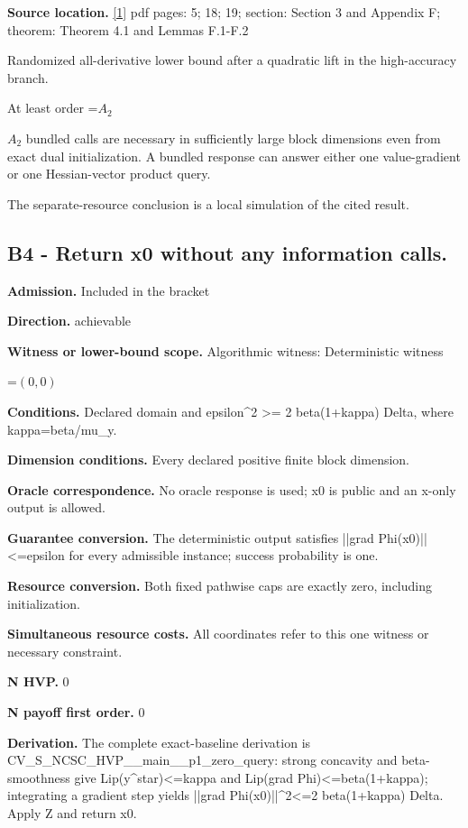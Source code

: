 \documentclass[10pt,a4paper]{article}
\newcommand{\AtlasMath}[1]{\par\begingroup\centering\setbox0=\hbox{$\displaystyle #1$}\ifdim\wd0>1.4\linewidth\typeout{ATLAS WIDE FORMULA: \the\wd0}\fi\ifdim\wd0>\linewidth\resizebox{\linewidth}{!}{\box0}\else\box0\fi\par\endgroup}
\newcommand{\AtlasInlineMath}[1]{\begingroup\setbox0=\hbox{$#1$}\ifdim\wd0>.4\linewidth\endgroup\AtlasMath{#1}\else\endgroup$#1$\fi}
\begin{document}
\textbf{Source location.} \href{https://arxiv.org/pdf/2610.16771v2}{[1]} pdf pages: 5; 18; 19; section: Section 3 and Appendix F; theorem: Theorem 4.1 and Lemmas F.1-F.2

Randomized all-derivative lower bound after a quadratic lift in the high-accuracy branch.

At least order \AtlasInlineMath{A_2} bundled calls are necessary in sufficiently large block dimensions even from exact dual initialization. A bundled response can answer either one value-gradient or one Hessian-vector product query.

The separate-resource conclusion is a local simulation of the cited result.

\subsection{B4 - Return x0 without any information calls.}
\textbf{Admission.} Included in the bracket

\textbf{Direction.} achievable

\textbf{Witness or lower-bound scope.} Algorithmic witness: Deterministic witness

\AtlasMath{(0,0)}
\textbf{Conditions.} Declared domain and epsilon\textasciicircum{}2 >= 2 beta(1+kappa) Delta, where kappa=beta/mu\_\allowbreak{}y.

\textbf{Dimension conditions.} Every declared positive finite block dimension.

\textbf{Oracle correspondence.} No oracle response is used; x0 is public and an x-only output is allowed.

\textbf{Guarantee conversion.} The deterministic output satisfies ||grad Phi(x0)||<=epsilon for every admissible instance; success probability is one.

\textbf{Resource conversion.} Both fixed pathwise caps are exactly zero, including initialization.

\textbf{Simultaneous resource costs.} All coordinates refer to this one witness or necessary constraint.

\textbf{N HVP.} 0

\textbf{N payoff first order.} 0

\textbf{Derivation.} The complete exact-baseline derivation is CV\_\allowbreak{}S\_\allowbreak{}NCSC\_\allowbreak{}HVP\_\allowbreak{}\_\allowbreak{}main\_\allowbreak{}\_\allowbreak{}p1\_\allowbreak{}zero\_\allowbreak{}query: strong concavity and beta-smoothness give Lip(y\textasciicircum{}star)<=kappa and Lip(grad Phi)<=beta(1+kappa); integrating a gradient step yields ||grad Phi(x0)||\textasciicircum{}2<=2 beta(1+kappa) Delta. Apply Z and return x0.
\end{document}
